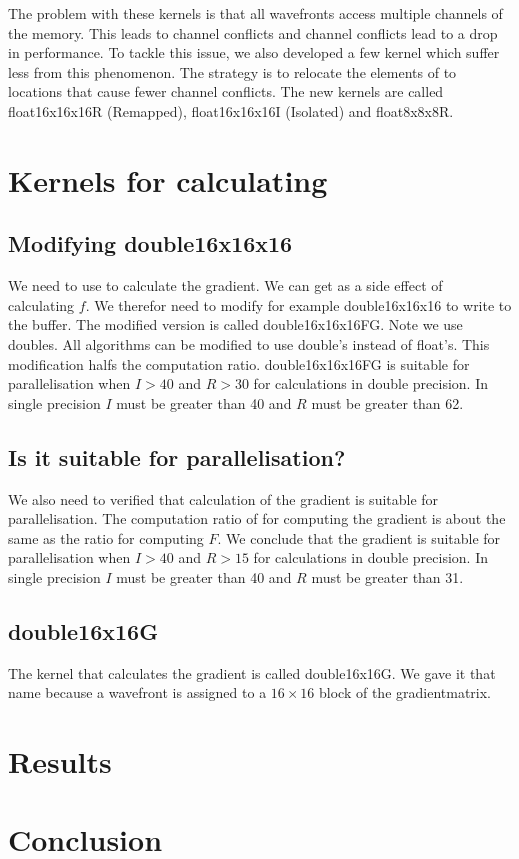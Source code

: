 \documentclass[11pt]{IEEEtran}
\begin{document}
 The problem with these kernels is that all wavefronts access multiple channels of the memory. This leads to channel conflicts and channel conflicts lead to a drop in performance. To tackle this issue, we also developed a few kernel which suffer less from this phenomenon. The strategy is to relocate the elements of \TT to locations that cause fewer channel conflicts.   The new kernels are called float16x16x16R (Remapped), float16x16x16I (Isolated) and float8x8x8R.

 
\section{Kernels for calculating \GGG{}}
\subsection{Modifying double16x16x16}
We need to use \FF{} to calculate the gradient. We can get \FF{} as a side effect of calculating $f$. We therefor need to modify for example double16x16x16 to write \FF{} to the buffer. The modified version is called double16x16x16FG. Note we use doubles. All algorithms can be modified to use double's instead of float's. This modification halfs the computation ratio. double16x16x16FG is suitable for parallelisation when $I > 40$ and $R > 30$ for calculations in double precision. In single precision $I$ must be greater than 40 and $R$ must be greater than 62.

\subsection{Is it suitable for parallelisation?}
We also need to verified that calculation of the gradient is suitable for parallelisation. The computation ratio of for computing the gradient is about the same as the ratio for computing $F$. We conclude that the gradient is suitable for parallelisation when $I > 40$ and $R > 15$ for calculations in double precision. In single precision $I$ must be greater than 40 and $R$ must be greater than 31.

\subsection{double16x16G}
The kernel that calculates the gradient is called double16x16G. We gave it that name because a wavefront is assigned to a $16 \times 16$ block of the gradientmatrix.

\section{Results}

\section{Conclusion}
\end{document}
